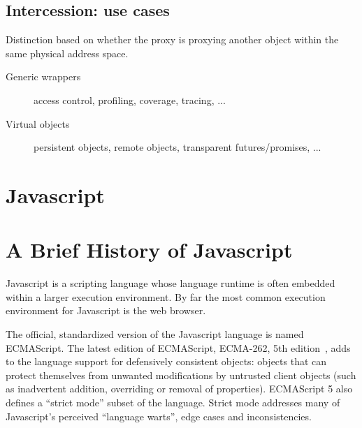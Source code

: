 \documentclass{acm_proc_article-sp}
\begin{document}

\subsection{Intercession: use cases}
\label{sub:use_cases}

Distinction based on whether the proxy is proxying another object within the same physical address space.

\begin{description}
  \item[Generic wrappers] access control, profiling, coverage, tracing, ...
  \item[Virtual objects] persistent objects, remote objects, transparent futures/promises, ...
\end{description}

\section{Javascript}

\section{A Brief History of Javascript}

Javascript is a scripting language whose language runtime is often embedded within a larger execution environment. By far the most common execution environment for Javascript is the web browser.

The official, standardized version of the Javascript language is named ECMAScript. The latest edition of ECMAScript, ECMA-262, 5th edition~\cite{ecma262}, adds to the language support for defensively consistent objects: objects that can protect themselves from unwanted modifications by untrusted client objects (such as inadvertent addition, overriding or removal of properties). ECMAScript 5 also defines a ``strict mode'' subset of the language. Strict mode addresses many of Javascript's perceived ``language warts'', edge cases and inconsistencies.
\end{document}

